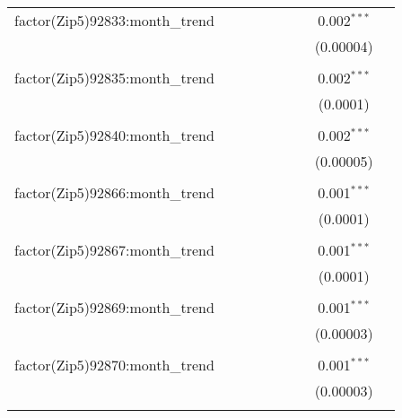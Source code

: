\begin{table}[H]
{\begin{tabular}{@{\extracolsep{5pt}}lcccccccc}
  factor(Zip5)92833:month\_trend &  &  &  &  &  &  & 0.002$^{***}$ &  \\  

   &  &  &  &  &  &  & (0.00004) &  \\  

   & & & & & & & & \\  

  factor(Zip5)92835:month\_trend &  &  &  &  &  &  & 0.002$^{***}$ &  \\  

   &  &  &  &  &  &  & (0.0001) &  \\  

   & & & & & & & & \\  

  factor(Zip5)92840:month\_trend &  &  &  &  &  &  & 0.002$^{***}$ &  \\  

   &  &  &  &  &  &  & (0.00005) &  \\  

   & & & & & & & & \\  

  factor(Zip5)92866:month\_trend &  &  &  &  &  &  & 0.001$^{***}$ &  \\  

   &  &  &  &  &  &  & (0.0001) &  \\  

   & & & & & & & & \\  

  factor(Zip5)92867:month\_trend &  &  &  &  &  &  & 0.001$^{***}$ &  \\  

   &  &  &  &  &  &  & (0.0001) &  \\  

   & & & & & & & & \\  

  factor(Zip5)92869:month\_trend &  &  &  &  &  &  & 0.001$^{***}$ &  \\  

   &  &  &  &  &  &  & (0.00003) &  \\  

   & & & & & & & & \\  

  factor(Zip5)92870:month\_trend &  &  &  &  &  &  & 0.001$^{***}$ &  \\  

   &  &  &  &  &  &  & (0.00003) &  \\  

   & & & & & & & & \\  


\end{tabular}}
\end{table}

